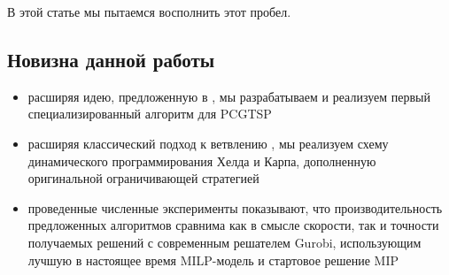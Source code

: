 В этой статье мы пытаемся восполнить этот пробел.

\subsection{Новизна данной работы}
\begin{itemize}
	\item
	расширяя идею, предложенную в \cite{SALMAN2020163},
	мы разрабатываем и реализуем первый специализированный алгоритм для PCGTSP
	\item
	расширяя классический подход к ветвлению \cite{MorinMarsten1976},
	мы реализуем схему динамического программирования Хелда и Карпа,
	дополненную оригинальной ограничивающей стратегией
	\item
	проведенные численные эксперименты показывают,
  что производительность предложенных алгоритмов
  сравнима как в смысле скорости, так и точности получаемых решений
  с современным решателем Gurobi,
  использующим лучшую в настоящее время MILP-модель
  и стартовое решение MIP

\end{itemize}
